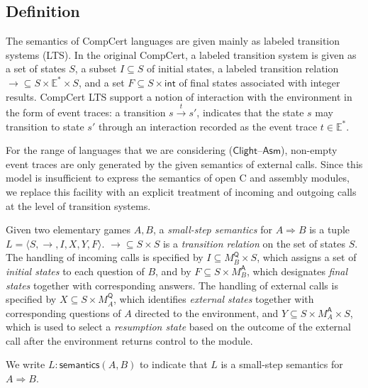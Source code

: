 \documentclass[acmsmall,timestamp,review,anonymous]{acmart}
\newcommand{\kw}[1]{\ensuremath{ \mathsf{#1} }}
\begin{document}

\subsection{Definition} %
\label{sec:modsem:def}

The semantics of CompCert languages are given mainly
as labeled transition systems (LTS).
In the original CompCert,
a labeled transition system is given as
a set of states $S$,
a subset $I \subseteq S$ of initial states,
a labeled transition relation
${\rightarrow} \subseteq S \times \mathbb{E}^* \times S$,
and a set
$F \subseteq S \times \kw{int}$
of final states associated with integer results.
CompCert LTS support a notion of interaction with the environment
in the form of event traces:
a transition $s \stackrel{t}{\rightarrow} s'$,
indicates that the state $s$ may transition to state $s'$
through an interaction recorded as the event trace $t \in \mathbb{E}^*$.

For the range of languages that we are considering
($\kw{Clight}$--$\kw{Asm}$),
non-empty event traces are only generated by
the given semantics of external calls.
Since this model is insufficient to express
the semantics of open C and assembly modules,
we replace this facility with
an explicit treatment of incoming and outgoing calls
at the level of transition systems.

\begin{definition}
Given two elementary games $A, B$,
a \emph{small-step semantics} for $A \Rightarrow B$
is a tuple $L = \langle S, \rightarrow, I, X, Y, F \rangle$.
${\rightarrow} \subseteq S \times S$ is a \emph{transition relation} on
the set of states $S$.
The handling of incoming calls is specified by
$I \subseteq M_B^\kw{Q} \times S$, which
assigns a set of \emph{initial states} to each question of $B$, and by
$F \subseteq S \times M_B^\kw{A}$,
which designates \emph{final states} together with corresponding answers.
The handling of external calls is specified by
$X \subseteq S \times M_A^\kw{Q}$,
which identifies \emph{external states} together with
corresponding questions of $A$ directed to the environment, and
$Y \subseteq S \times M_A^\kw{A} \times S$,
which is used to select a \emph{resumption state}
based on the outcome of the external call
after the environment returns control to the module.

We write $L : \kw{semantics}(A, B)$ to indicate that
$L$ is a small-step semantics for $A \Rightarrow B$.
\end{definition}
\end{document}
